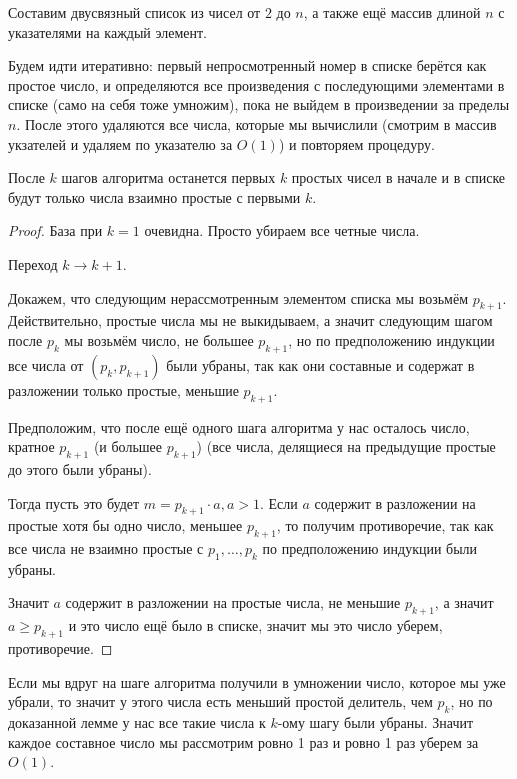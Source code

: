 \documentclass[a4paper, 12pt]{article}
\begin{document}
Составим двусвязный список из чисел от $2$ до $n$, а также ещё массив длиной
$n$ с указателями на каждый элемент.

Будем идти итеративно: первый непросмотренный номер в списке берётся как простое
число, и определяются все произведения с последующими элементами в списке (само на себя тоже умножим), пока
не выйдем в произведении за пределы $n$. После этого удаляются
все числа, которые мы вычислили (смотрим в массив укзателей и удаляем по указателю
за $O(1)$) и повторяем процедуру.

\begin{Lemma}
После $k$ шагов алгоритма останется первых $k$ простых чисел в начале и в списке
будут только числа взаимно простые с первыми $k$.
\end{Lemma}

\begin{proof}

  База при $k = 1$ очевидна. Просто убираем все четные числа.

  Переход $k \to k + 1$.

  Докажем, что следующим нерассмотренным элементом списка мы возьмём $p_{k + 1}$. Действительно, простые
  числа мы не выкидываем, а значит следующим шагом после $p_k$
  мы возьмём число, не большее $p_{k + 1}$, но по предположению
  индукции все числа от $(p_k, p_{k + 1})$ были убраны, так как
  они составные и содержат в разложении только простые, меньшие $p_{k + 1}$.

  Предположим, что после ещё одного шага алгоритма у нас осталось число, кратное
  $p_{k + 1}$ (и большее $p_{k + 1}$)
  (все числа, делящиеся на предыдущие простые до этого были убраны).

  Тогда пусть это будет $m = p_{k + 1} \cdot a, a > 1$. Если $a$ содержит в разложении
  на простые хотя бы одно число, меньшее $p_{k + 1}$, то получим противоречие, так
  как все числа не взаимно простые с $p_1, \ldots, p_k$ по предположению индукции были убраны.

  Значит $a$ содержит в разложении на простые числа, не меньшие $p_{k + 1}$, а значит
  $a \geqslant p_{k + 1}$ и это число ещё было в списке, значит мы это число уберем, противоречие.
\end{proof}

Если мы вдруг на шаге алгоритма получили в умножении число, которое мы уже убрали, то
значит у этого числа есть меньший простой делитель, чем $p_{k}$, но по доказанной лемме у нас все такие числа к $k$-ому шагу
были убраны. Значит каждое составное число мы рассмотрим ровно 1 раз и ровно
1 раз уберем за $O(1)$.
\end{document}
